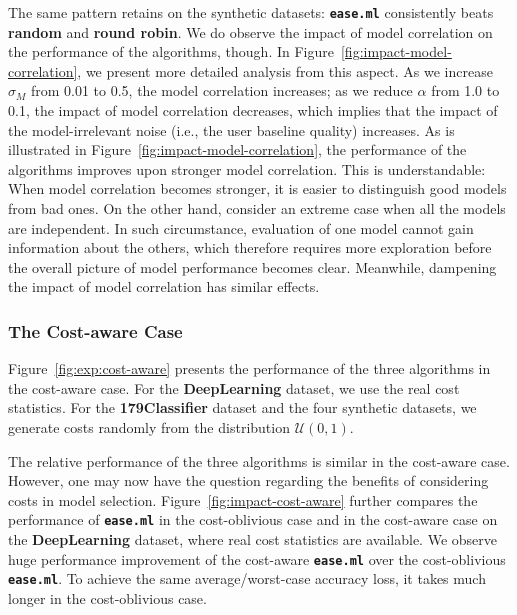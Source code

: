 \documentclass[letterpaper]{vldb}
\newcommand{\eml}{\texttt{ease.ml}\xspace}
\begin{document}
The same pattern retains on the synthetic datasets: {\bf \eml} consistently beats {\bf random} and {\bf round robin}.
We do observe the impact of model correlation on the performance of the algorithms, though.
In Figure~\ref{fig:impact-model-correlation}, we present more detailed analysis from this aspect.
As we increase $\sigma_M$ from 0.01 to 0.5, the model correlation increases; as we reduce $\alpha$ from 1.0 to 0.1, the impact of model correlation decreases, which implies that the impact of the model-irrelevant noise (i.e., the user baseline quality) increases.
As is illustrated in Figure~\ref{fig:impact-model-correlation}, the performance of the algorithms improves upon stronger model correlation.
This is understandable: When model correlation becomes stronger, it is easier to distinguish good models from bad ones.
On the other hand, consider an extreme case when all the models are independent.
In such circumstance, evaluation of one model cannot gain information about the others, which therefore requires more exploration before the overall picture of model performance becomes clear.
Meanwhile, dampening the impact of model correlation has similar effects.

\subsubsection{The Cost-aware Case}

Figure~\ref{fig:exp:cost-aware} presents the performance of the three algorithms in the cost-aware case.
For the {\bf DeepLearning} dataset, we use the real cost statistics.
For the {\bf 179Classifier} dataset and the four synthetic datasets, we generate costs randomly from the distribution $\mathcal{U}(0,1)$.



The relative performance of the three algorithms is similar in the cost-aware case.
However, one may now have the question regarding the benefits of considering costs in model selection.
Figure~\ref{fig:impact-cost-aware} further compares the performance of {\bf \eml} in the cost-oblivious case and in the cost-aware case on the {\bf DeepLearning} dataset, where real cost statistics are available.
We observe huge performance improvement of the cost-aware {\bf \eml} over the cost-oblivious {\bf \eml}.
To achieve the same average/worst-case accuracy loss, it takes much longer in the cost-oblivious case.
\end{document}
